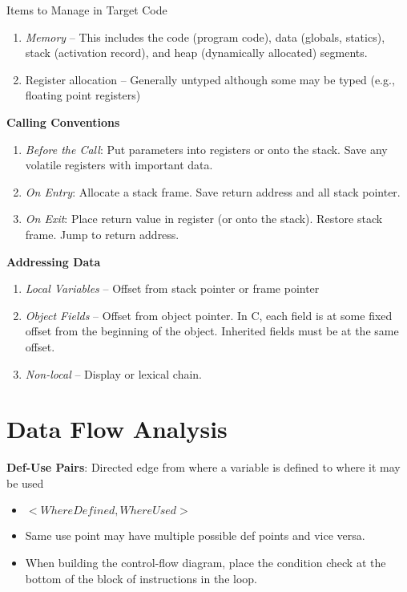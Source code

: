 \documentclass[10pt,twocolumn]{report}
\begin{document}
Items to Manage in Target Code
\begin{enumerate}
  \item \emph{Memory} -- This includes the code (program code), data (globals, statics), stack (activation record), and heap (dynamically allocated) segments.
  \item Register allocation -- Generally untyped although some may be typed (e.g., floating point registers)
\end{enumerate}

\textbf{Calling Conventions}
\begin{enumerate}
  \item \emph{Before the Call}: Put parameters into registers or onto the stack. Save any volatile registers with important data.
  \item \emph{On Entry}: Allocate a stack frame. Save return address and all stack pointer.
  \item \emph{On Exit}: Place return value in register (or onto the stack). Restore stack frame. Jump to return address.
\end{enumerate}

\textbf{Addressing Data}
\begin{enumerate}
  \item \emph{Local Variables} -- Offset from stack pointer or frame pointer
  \item \emph{Object Fields} -- Offset from object pointer. In C, each field is at some fixed offset from the beginning of the object.  Inherited fields must be at the same offset.
  \item \emph{Non-local} -- Display or lexical chain.
\end{enumerate}

\section{Data Flow Analysis}

\textbf{Def-Use Pairs}: Directed edge from where a variable is defined to where it may be used
\begin{itemize}
  \item $<WhereDefined,WhereUsed>$
  \item Same use point may have multiple possible def points and vice versa.
  \item When building the control-flow diagram, place the condition check at the bottom of the block of instructions in the loop.
\end{itemize}
\end{document}
